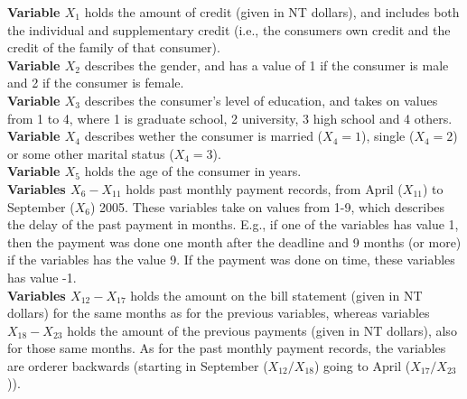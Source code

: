 \documentclass[11pt,english, A4]{article}
\begin{document}
\textbf{Variable $X_{1}$} holds the amount of credit (given in NT dollars), and includes both the individual and supplementary credit (i.e., the consumers own credit and the credit of the family of that consumer).\\
\textbf{Variable $X_{2}$} describes the gender, and has a value of 1 if the consumer is male and 2 if the consumer is female.\\
\textbf{Variable $X_{3}$} describes the consumer's level of education, and takes on values from 1 to 4, where 1 is graduate school, 2 university, 3 high school and 4 others.\\
\textbf{Variable $X_{4}$} describes wether the consumer is married ($X_{4} = 1$), single ($X_{4} = 2$) or some other marital status ($X_{4} = 3$).\\ 
\textbf{Variable $X_{5}$} holds the age of the consumer in years.\\
\textbf{Variables $X_{6} - X_{11}$} holds past monthly payment records, from April ($X_{11}$) to September ($X_{6}$) 2005. These variables take on values from 1-9, which describes the delay of the past payment in months. E.g., if one of the variables has value 1, then the payment was done one month after the deadline and 9 months (or more) if the variables has the value 9. If the payment was done on time, these variables has value -1.\\ 
\textbf{Variables $X_{12} - X_{17}$} holds the amount on the bill statement (given in NT dollars) for the same months as for the previous variables, whereas variables $X_{18} - X_{23}$ holds the amount of the previous payments (given in NT dollars), also for those same months. As for the past monthly payment records, the variables are orderer backwards (starting in September ($X_{12} / X_{18}$) going to April ($X_{17}/X_{23}$)).
\end{document}
